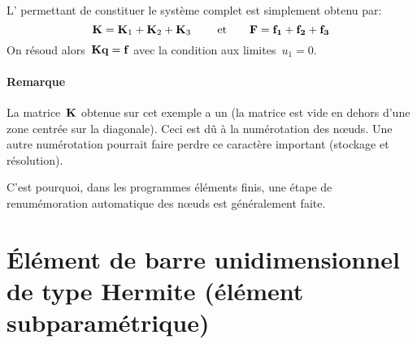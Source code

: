 \medskipvm
L' permettant de constituer le système complet est simplement obtenu par:
\begin{equation} \MM{K}=\MM{K}_1+\MM{K}_2+\MM{K}_3 \qquad \text{ et} \qquad \VV{F}=\VV{f_1}+\VV{f_2}+\VV{f_3} \end{equation}
\medskipvm
On résoud alors~$\MM{K}\VV{q}=\VV{f}$ avec la condition aux limites~$u_1=0$.
\medskipvm
\paragraph{Remarque}
La matrice~$\MM{K}$ obtenue sur cet exemple a un  (la matrice est 
vide en dehors d'une zone centrée sur la diagonale). Ceci est dû à la numérotation des nœuds. 
Une autre numérotation pourrait faire perdre ce caractère important (stockage et résolution).

C'est pourquoi, dans les programmes éléments finis, une étape de renumémoration automatique des nœuds
est généralement faite.
\medskipvm
\ifVersionAvecExemplesSepares
  \section{Élément de barre unidimensionnel de type Hermite (élément subparamétrique)}
\else
